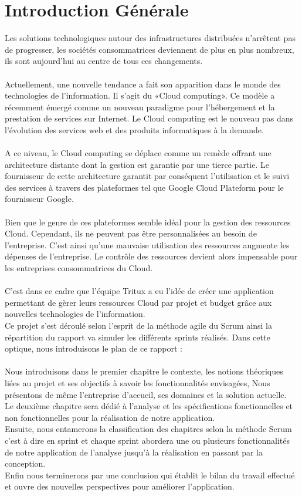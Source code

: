 
\chapter*{Introduction Générale}
Les solutions technologiques autour des infrastructures distribuées n'arrêtent pas de progresser, les sociétés consommatrices deviennent de plus en plus nombreux, ils sont aujourd'hui au centre
de tous ces changements.\\\\ Actuellement, une nouvelle tendance a fait son apparition dans le monde des technologies
de l'information. Il s'agit du «Cloud computing». Ce
modèle a récemment émergé comme un nouveau paradigme pour l'hébergement
et la prestation de services sur Internet. Le Cloud computing est le nouveau pas
dans l'évolution des services web et des produits informatiques à la demande.\\\\
A ce niveau, le Cloud computing se déplace comme un remède offrant une architecture distante dont la gestion est garantie par une tierce partie. Le fournisseur de cette architecture garantit par conséquent l'utilisation et le suivi des services à travers des plateformes tel que Google Cloud Plateform  pour le fournisseur Google.\\\\ Bien que  le genre de ces plateformes semble idéal pour la gestion des ressources Cloud. Cependant, ils ne peuvent pas être personnalisées au besoin de l'entreprise. C'est ainsi qu'une mauvaise utilisation des ressources  augmente les dépenses de l'entreprise. Le contrôle des ressources devient  alors impensable pour les entreprises consommatrices du Cloud.\\\\
C'est dans ce cadre que l'équipe Tritux a eu l'idée de créer une
application permettant de gèrer leurs ressources Cloud par projet et budget grâce aux nouvelles technologies de l'information.\\
Ce projet s'est déroulé selon l'esprit de la méthode agile du Scrum ainsi la répartition du rapport va simuler les différents sprints réalisés. Dans cette optique, nous introduisons le plan de ce rapport :\\\\
Nous introduisons dans le premier chapitre le contexte, les notions théoriques liées au projet et ses objectifs à
savoir les fonctionnalités envisagées, Nous présentons de même l'entreprise d'accueil,
ses domaines et la solution actuelle.\\
Le deuxième chapitre sera dédié à l'analyse et les spécifications fonctionnelles et non
fonctionnelles pour la réalisation de notre application.\\
Ensuite, nous entamerons la classification des chapitres selon la méthode Scrum c'est
à dire en sprint et chaque sprint abordera une ou plusieurs fonctionnalités de notre application de l'analyse jusqu'à la réalisation en passant par la conception.\\
Enfin nous terminerons par une conclusion qui établit le bilan du travail effectué et ouvre des
nouvelles perspectives pour améliorer l'application.


